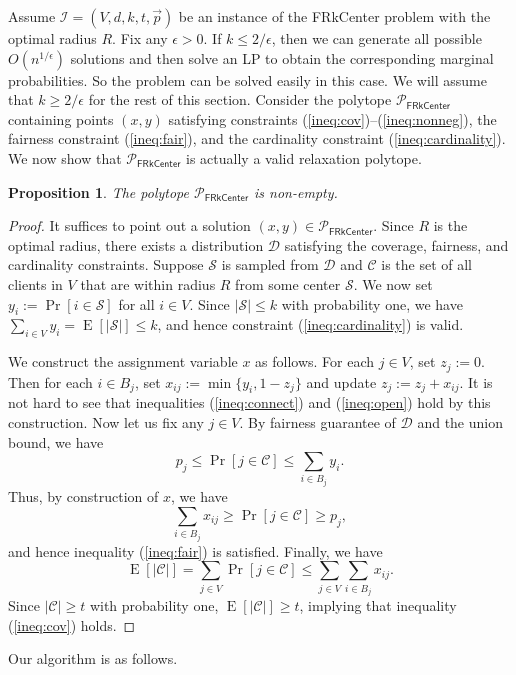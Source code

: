 \documentclass[a4paper,11pt]{article}
\newtheorem{proposition}[theorem]{Proposition}
\DeclareMathOperator*{\E}{\mathrm{E}}
\newcommand{\C}{\mathcal{C}}
\newcommand{\D}{\mathcal{D}}
\renewcommand{\S}{\mathcal{S}}
\newcommand{\I}{\mathcal{I}}
\renewcommand{\P}{\mathcal{P}}
\begin{document}
Assume $\I = (V,d,k,t, \vec{p})$ be an instance of the \textsf{FRkCenter} problem with the optimal radius $R$. Fix any $\epsilon > 0$. If $k \leq 2/\epsilon$, then we can generate all possible $O\left(n^{1/\epsilon}\right)$ solutions and then solve an LP to obtain the corresponding marginal probabilities. So the problem can be solved easily in this case. We will assume that $k \geq 2/\epsilon$ for the rest of this section. Consider the polytope $\P_\textsf{FRkCenter}$  containing points $(x, y)$ satisfying constraints (\ref{ineq:cov})--(\ref{ineq:nonneg}), the fairness constraint (\ref{ineq:fair}), and the cardinality constraint (\ref{ineq:cardinality}). We now show that $\P_\textsf{FRkCenter}$ is actually a valid relaxation polytope.
\begin{proposition} The polytope $\P_\textsf{FRkCenter}$ is non-empty.
\label{prop:frkcenter}
\end{proposition}
\begin{proof}
It suffices to point out a solution $(x,y) \in \P_\textsf{FRkCenter}$. Since $R$ is the optimal radius, there exists a distribution $\D$ satisfying the coverage, fairness, and cardinality constraints. Suppose $\S$ is sampled from $\D$ and $\C$ is the set of all clients in $V$ that are within radius $R$ from some center $\S$. We now set $y_i := \Pr[i \in \S]$ for all $i \in V$. Since $|\S| \leq k$ with probability one, we have $\sum_{i \in V} y_i = \E[|\S|] \leq k$, and hence constraint (\ref{ineq:cardinality}) is valid. 

We construct the assignment variable $x$ as follows. For each $j \in V$, set $z_j := 0$. Then for each $i \in B_j$, set $x_{ij} := \min\{y_i, 1-z_j\}$ and update $z_j := z_j + x_{ij}$. It is not hard to see that inequalities (\ref{ineq:connect}) and (\ref{ineq:open}) hold by this construction. Now let us fix any $j \in V$. By fairness guarantee of $\D$ and the union bound, we have
$$p_j \leq \Pr[j \in \C] \leq \sum_{i \in B_j} y_i.$$
Thus, by construction of $x$, we have
$$\sum_{i \in B_j} x_{ij} \geq \Pr[j \in \C] \geq p_j,$$
and hence inequality (\ref{ineq:fair}) is satisfied. Finally, we have
$$ \E[|\C|] = \sum_{j \in V} \Pr[j \in \C] \leq \sum_{j \in V} \sum_{i \in B_j} x_{ij}.$$
Since $|\C| \geq t$ with probability one, $\E[|\C|] \geq t$, implying that inequality (\ref{ineq:cov}) holds.

\end{proof}

Our algorithm is as follows.
\end{document}
